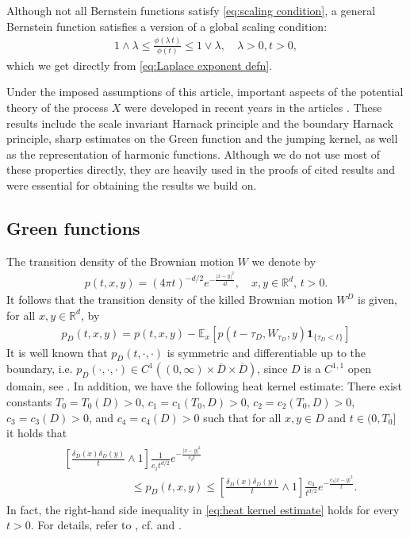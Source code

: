 \documentclass[12pt,a4paper,onecolumn]{amsart}
\theoremstyle{definition}
\newcommand{\R}{\mathbb{R}}
\newcommand{\ex}{\mathbb{E}}
\newcommand{\1}{\mathbf 1}
\newcommand{\de}{\delta_D}
\numberwithin{equation}{section}
\begin{document}
{Although} not all Bernstein functions satisfy \eqref{eq:scaling condition}, a general Bernstein function satisfies a version of a global scaling condition:
\begin{align}\label{eq:simple global scaling}
	1\wedge \lambda \le \frac{\phi(\lambda \, t)}{\phi(t)}\le 1\vee  \lambda,\quad \lambda>0,t>0,
\end{align}
which we get directly from \eqref{eq:Laplace exponent defn}.



Under the imposed assumptions of this article, important aspects of the potential theory of the process $X$ were developed in recent years in the articles \cite{song_vondra_JTP2006,ksv_minimal2016,ksv_potential_SKBM_2020,ksv_BdryKillLevy2020,Bio23}. These results include the scale invariant Harnack principle and the boundary Harnack principle, sharp estimates on the Green function and the jumping kernel, as well as the representation of harmonic functions. Although we do not use most of these properties directly, they are heavily used in the proofs of cited results and were essential for obtaining the results we build on.


	\subsection{Green functions}
The transition density of the Brownian motion $W$ we denote by
\begin{align}\label{eq:trans.dens.BM}
	p(t,x,y)=(4\pi t)^{-d/2}e^{-\frac{|x-y|^2}{4t}},\quad x,y\in\R^d,\, t>0.
\end{align}
It follows that the transition density of the killed Brownian motion $W^D$ is given, for all $x,y\in\R^d$, by
\begin{align}\label{eq:trans.dens. KBM}
	p_D(t,x,y)=p(t,x,y)-\ex_x[p(t-\tau_D,W_{\tau_D},y)\1_{\{\tau_D<t\}}]
\end{align}
It is well known that $p_D(t,\cdot,\cdot)$  is symmetric and  differentiable up to the boundary, i.e. $p_D(\cdot,\cdot,\cdot)\in C^1((0,\infty)\times \overline D\times \overline D)$, since $D$ is a $C^{1,1}$ open domain, see \cite[Lemma A.7]{Bio23}. In addition, we have the following heat kernel estimate: There exist constants $T_0=T_0(D)>0$, $c_1=c_1(T_0,D)>0$, $c_2=c_2(T_0,D)>0$, $c_3=c_3(D)>0$, and $c_4=c_4(D)>0$ such that for all $x,y\in D$ and $t\in(0,T_0]$ it holds that
\begin{align}
\begin{split}\label{eq:heat kernel estimate}
    &\left[\frac{\de(x)\de(y)}{t}\wedge 1\right]\frac{1}{c_1 	t^{d/2}}e^{-\frac{|x-y|^2}{c_2t}}\\&\hspace{6em}\le p_D(t,x,y)\le \left[\frac{\de(x)\de(y)}{t}\wedge 1\right]\frac{c_3}{t^{d/2}}e^{-\frac{c_4|x-y|^2}{t}}.
\end{split}
\end{align}
In fact, the right-hand side inequality in \eqref{eq:heat kernel estimate} holds for every $t>0$. For details, refer to \cite[Theorem 3.1 \& Theorem 3.8]{song_sharp_bounds_2004}, cf. \cite[Theorem 1.1]{zhang_heat_kernel} and \cite[Theorem 4.6.9]{davies_HeatKernel}.
\end{document}
